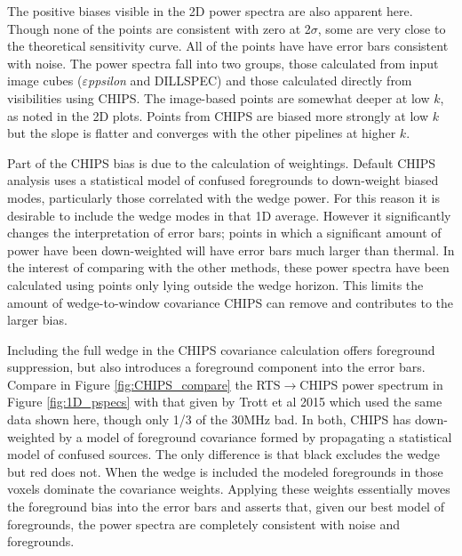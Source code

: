 \documentclass[twolcolumn,iop]{emulateapj}
\def\eppsilon{{\it $\varepsilon$ppsilon}}
\def\empirical{DILLSPEC}
\def\chipscite{Trott et al 2015}
\begin{document}
The positive biases visible in the 2D power spectra are also apparent here. Though none of the points are consistent with zero at 2$\sigma$, some are very close to the theoretical sensitivity curve. All of the points have  have error bars consistent with noise. The power spectra fall into two groups, those calculated from input image cubes (\eppsilon{} and \empirical{}) and those calculated directly from visibilities using CHIPS. The image-based points are somewhat deeper at low $k$, as noted in the 2D plots.  Points from CHIPS are biased more strongly at low $k$ but the slope is flatter and converges with the other pipelines at higher $k$.  

Part of the CHIPS bias is due to the calculation of weightings. Default CHIPS analysis uses a statistical model of confused foregrounds to down-weight biased modes, particularly those correlated with the wedge power. For this reason it is desirable to include the wedge modes in that 1D average. However it significantly changes the interpretation of error bars; points in which a significant amount of power have been down-weighted will have error bars much larger than thermal. In the interest of comparing with the other methods, these power spectra have been calculated using points only lying outside the wedge horizon. This limits the amount of wedge-to-window covariance CHIPS can remove and contributes to the larger bias. 

Including the full wedge in the CHIPS covariance calculation offers foreground suppression, but also introduces a foreground component into the error bars. Compare in Figure \ref{fig:CHIPS_compare} the RTS$\to$CHIPS power spectrum in Figure \ref{fig:1D_pspecs} with that given by \chipscite{} which used the same data shown here, though only 1/3 of the 30MHz bad.  In both, CHIPS has down-weighted by a model of foreground covariance formed by propagating a statistical model of confused sources. The only difference is that black excludes the wedge but red does not. When the wedge is included the modeled foregrounds in those voxels dominate the covariance weights. Applying these weights essentially moves the foreground bias into the error bars and asserts that, given our best model of foregrounds, the power spectra are completely consistent with noise and  foregrounds.
\end{document}
